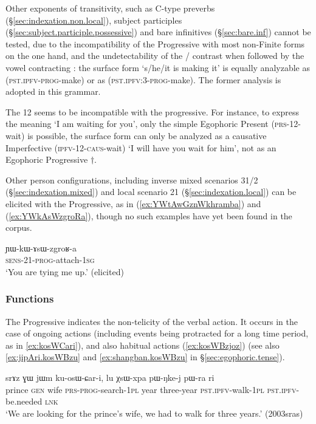 Other exponents of transitivity, such as C-type preverbs (§\ref{sec:indexation.non.local}), subject participles (§\ref{sec:subject.participle.possessive}) and bare infinitives (§\ref{sec:bare.inf}) cannot be tested, due to the incompatibility of the Progressive with most non-Finite forms on the one hand, and the undetectability of the / contrast when followed by the vowel contracting : the surface form  `s/he/it is making it' is equally analyzable as  (\textsc{pst}.\textsc{ipfv}-\textsc{prog}-make) or as  (\textsc{pst}.\textsc{ipfv}:3\flobv{}-\textsc{prog}-make). The former analysis is adopted in this grammar.

The 1\fl{}2  seems to be incompatible with the progressive. For instance, to express the meaning `I am waiting for you', only the simple Egophoric Present  (\textsc{prs}-1\fl{}2-wait) is possible, the surface form  can only be analyzed as a causative Imperfective  (\textsc{ipfv}-1\fl{}2-\textsc{caus}-wait) `I will have you wait for him', not as an Egophoric Progressive $\dagger$.

Other person configurations, including inverse mixed scenarios 3\fl{}1/2 (§\ref{sec:indexation.mixed}) and local scenario 2\fl{}1 (§\ref{sec:indexation.local}) can be elicited with the Progressive, as in (\ref{ex:YWtAwGznWkhramba}) and (\ref{ex:YWkAsWzgroRa}), though no such examples have yet been found in the corpus.

\begin{exe}
\ex \label{ex:YWkAsWzgroRa}
\gll ɲɯ-kɯ-ɤsɯ-zgroʁ-a \\
\textsc{sens}-2\fl{}1-\textsc{prog}-attach-\textsc{1sg} \\
\glt `You are tying me up.' (elicited)
 \end{exe}
 
\subsubsection{Functions} \label{sec:progressive.function}
The Progressive indicates the non-telicity of the verbal action. It occurs in the case of ongoing actions (including events being protracted for a long time period, as in \ref{ex:kosWCari}), and also habitual actions (\ref{ex:kosWBzjoz}) (see also \ref{ex:jipAri.kosWBzu} and \ref{ex:shangban.kosWBzu} in §\ref{sec:egophoric.tense}).

\begin{exe}
\ex \label{ex:kosWCari}
\gll srɤz ɣɯ jɯm ku-osɯ-ɕar-i, lu χsɯ-xpa pɯ-ŋke-j pɯ-ra ri  \\
prince \textsc{gen} wife \textsc{prs}-\textsc{prog}-search-\textsc{1pl} year three-year \textsc{pst}.\textsc{ipfv}-walk-\textsc{1pl} \textsc{pst}.\textsc{ipfv}-be.needed \textsc{lnk} \\
\glt `We are looking for the prince's wife, we had to walk for three years.'  (2003sras)
 \end{exe}
 
